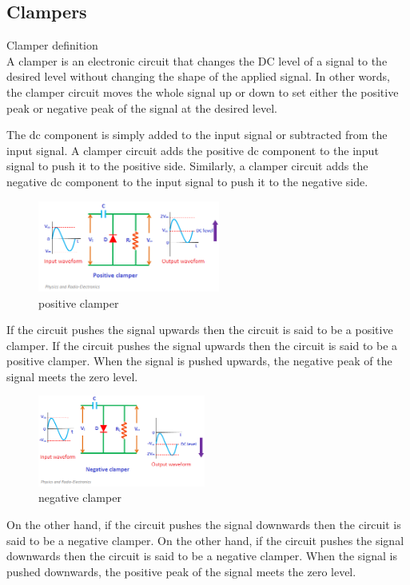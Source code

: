\documentclass{article}
\begin{document}
	
	\subsection{\large Clampers}
	\large{Clamper definition\\}
A clamper is an electronic circuit that changes the DC level of a signal to the desired level without changing the shape of the applied signal. In other words, the clamper circuit moves the whole signal up or down to set either the positive peak or negative peak of the signal at the desired level.

The dc component is simply added to the input signal or subtracted from the input signal. A clamper circuit adds the positive dc component to the input signal to push it to the positive side. Similarly, a clamper circuit adds the negative dc component to the input signal to push it to the negative side.
\begin{figure}[H]
	\centering
	\includegraphics[height=3cm]{positiveclamper.png}
	\caption{positive clamper}
\end{figure}

If the circuit pushes the signal upwards then the circuit is said to be a positive clamper.
If the circuit pushes the signal upwards then the circuit is said to be a positive clamper. When the signal is pushed upwards, the negative peak of the signal meets the zero level.
\begin{figure}[H]
	\centering
	\includegraphics[height=3cm]{negativeclamper.png}
	\caption{negative clamper}
\end{figure}

On the other hand, if the circuit pushes the signal downwards then the circuit is said to be a negative clamper.
On the other hand, if the circuit pushes the signal downwards then the circuit is said to be a negative clamper. When the signal is pushed downwards, the positive peak of the signal meets the zero level.
\end{document}
